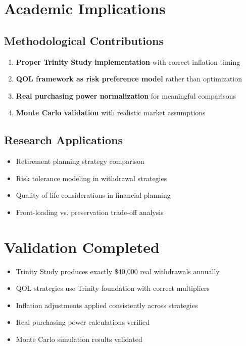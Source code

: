 \documentclass[11pt,letterpaper]{article}
\begin{document}
\section{Academic Implications}

\subsection{Methodological Contributions}
\begin{enumerate}
    \item \textbf{Proper Trinity Study implementation} with correct inflation timing
    \item \textbf{QOL framework as risk preference model} rather than optimization
    \item \textbf{Real purchasing power normalization} for meaningful comparisons
    \item \textbf{Monte Carlo validation} with realistic market assumptions
\end{enumerate}

\subsection{Research Applications}
\begin{itemize}
    \item Retirement planning strategy comparison
    \item Risk tolerance modeling in withdrawal strategies
    \item Quality of life considerations in financial planning
    \item Front-loading vs. preservation trade-off analysis
\end{itemize}

\section{Validation Completed}
\begin{itemize}
    \item [\checkmark] Trinity Study produces exactly \$40,000 real withdrawals annually
    \item [\checkmark] QOL strategies use Trinity foundation with correct multipliers
    \item [\checkmark] Inflation adjustments applied consistently across strategies
    \item [\checkmark] Real purchasing power calculations verified
    \item [\checkmark] Monte Carlo simulation results validated
\end{itemize}
\end{document}
